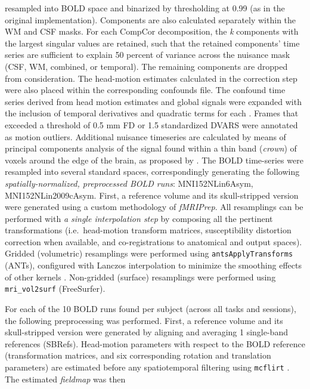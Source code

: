 \documentclass[
]{article}
\begin{document}
\begin{description}
resampled into BOLD space and binarized by thresholding at 0.99 (as in
the original implementation). Components are also calculated separately
within the WM and CSF masks. For each CompCor decomposition, the
\emph{k} components with the largest singular values are retained, such
that the retained components' time series are sufficient to explain 50
percent of variance across the nuisance mask (CSF, WM, combined, or
temporal). The remaining components are dropped from consideration. The
head-motion estimates calculated in the correction step were also placed
within the corresponding confounds file. The confound time series
derived from head motion estimates and global signals were expanded with
the inclusion of temporal derivatives and quadratic terms for each
\citep{confounds_satterthwaite_2013}. Frames that exceeded a threshold
of 0.5 mm FD or 1.5 standardized DVARS were annotated as motion
outliers. Additional nuisance timeseries are calculated by means of
principal components analysis of the signal found within a thin band
(\emph{crown}) of voxels around the edge of the brain, as proposed by
\citep{patriat_improved_2017}. The BOLD time-series were resampled into
several standard spaces, correspondingly generating the following
\emph{spatially-normalized, preprocessed BOLD runs}: MNI152NLin6Asym,
MNI152NLin2009cAsym. First, a reference volume and its skull-stripped
version were generated using a custom methodology of \emph{fMRIPrep}.
All resamplings can be performed with \emph{a single interpolation step}
by composing all the pertinent transformations (i.e.~head-motion
transform matrices, susceptibility distortion correction when available,
and co-registrations to anatomical and output spaces). Gridded
(volumetric) resamplings were performed using
\texttt{antsApplyTransforms} (ANTs), configured with Lanczos
interpolation to minimize the smoothing effects of other kernels
\citep{lanczos}. Non-gridded (surface) resamplings were performed using
\texttt{mri\_vol2surf} (FreeSurfer).
\item[Functional data preprocessing]
For each of the 10 BOLD runs found per subject (across all tasks and
sessions), the following preprocessing was performed. First, a reference
volume and its skull-stripped version were generated by aligning and
averaging 1 single-band references (SBRefs). Head-motion parameters with
respect to the BOLD reference (transformation matrices, and six
corresponding rotation and translation parameters) are estimated before
any spatiotemporal filtering using \texttt{mcflirt} \citep[FSL
6.0.5.1:57b01774,][]{mcflirt}. The estimated \emph{fieldmap} was then

\end{description}
\end{document}
